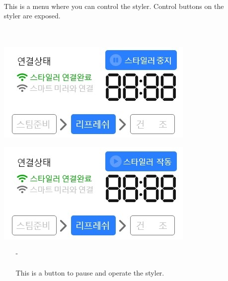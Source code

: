 \documentclass[conference]{IEEEtran}
\begin{document}
          \begin{itemize}
    \item[] \\ \\ \\ This is a menu where you can control the styler. Control buttons on the styler are exposed. \\ \\ \\ 
    \centerline{\includegraphics[scale=0.6]{11-1. 스타일러.jpg}}
    \centerline{\includegraphics[scale=0.6]{11-2. 스타일러.jpg}}
    \begin{itemize}
    \item[-] \\ \\ This is a button to pause and operate the styler.
\end{itemize}
\end{itemize}
\end{document}
